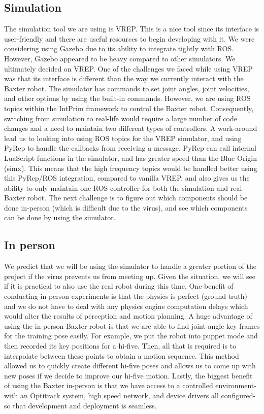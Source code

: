 \documentclass[letterpaper, 10 pt, conference]{ieeeconf}  %
\begin{document}
\subsection{Simulation} 
The simulation tool we are using is VREP. This is a nice tool since its interface is user-friendly and there are useful resources to begin developing with it. We were considering using Gazebo due to its ability to integrate tightly with ROS. However, Gazebo appeared to be heavy compared to other simulators. We ultimately decided on VREP. 
\newline
\indent
One of the challenges we faced while using VREP was that its interface is different than the way we currently interact with the Baxter robot. The simulator has commands to set joint angles, joint velocities, and other options by using the built-in commands. However, we are using ROS topics within the IntPrim framework to control the Baxter robot. Consequently, switching from simulation to real-life would require a large number of code changes and a need to maintain two different types of controllers. 
\newline
\indent A work-around lead us to looking into using ROS topics for the VREP simulator, and using PyRep to handle the callbacks from receiving a message. PyRep can call internal LuaScript functions in the simulator, and has greater speed than the Blue Origin (simx). This means that the high frequency topics would be handled better using this PyRep/ROS integration, compared to vanilla VREP, and also gives us the ability to only maintain one ROS controller for both the simulation and real Baxter robot. The next challenge is to figure out which components should be done in-person (which is difficult due to the virus), and see which components can be done by using the simulator. 
\subsection{In person}
We predict that we will be using the simulator to handle a greater portion of the project if the virus prevents us from meeting up. Given the situation, we will see if it is practical to also use the real robot during this time. One benefit of conducting in-person experiments is that the physics is perfect (ground truth) and we do not have to deal with any physics engine computation delays which would alter the results of perception and motion planning. A huge advantage of using the in-person Baxter robot is that we are able to find joint angle key frames for the training pose easily. For example, we put the robot into puppet mode and then recorded its key positions for a hi-five. Then, all that is required is to interpolate between these points to obtain a motion sequence. This method allowed us to quickly create different hi-five poses and allows us to come up with new poses if we decide to improve our hi-five motion. Lastly, the biggest benefit of using the Baxter in-person is that we have access to a controlled environment- with an Optitrack system, high speed network, and device drivers all configured- so that development and deployment is seamless.
\end{document}
